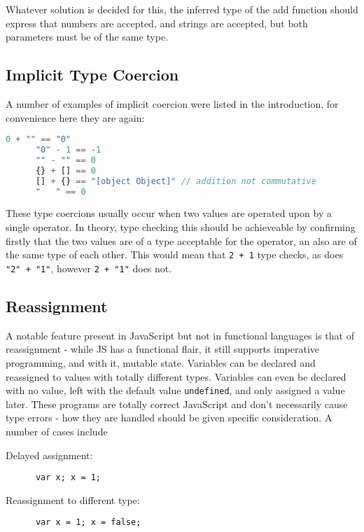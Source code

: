 \documentclass[british, twoside]{bhamthesis}
\theoremstyle{definition}
\begin{document}
    Whatever solution is decided for this, the inferred type of the add function should express that numbers are accepted, and strings are accepted, but both parameters must be of the same type.

  \subsection{Implicit Type Coercion}
    A number of examples of implicit coercion were listed in the introduction, for convenience here they are again:

    \begin{lstlisting}[language=JavaScript]
      0 + "" == "0"
      "0" - 1 == -1
      "" - "" == 0
      {} + [] == 0
      [] + {} == "[object Object]" // addition not commutative
      "   " == 0
    \end{lstlisting}

    These type coercions usually occur when two values are operated upon by a single operator. In theory, type checking this should be achieveable by confirming firstly that the two values are of a type acceptable for the operator, an also are of the same type of each other. This would mean that \texttt{2 + 1} type checks, as does \texttt{"2" + "1"}, however \texttt{2 + "1"} does not.

  \subsection{Reassignment}

    A notable feature present in JavaScript but not in functional languages is that of reassignment - while JS has a functional flair, it still supports imperative programming, and with it, mutable state. Variables can be declared and reassigned to values with totally different types. Variables can even be declared with no value, left with the default value \texttt{undefined}, and only assigned a value later. These programs are totally correct JavaScript and don't necessarily cause type errors - how they are handled should be given specific consideration. A number of cases include

    Delayed assignment:
    \begin{lstlisting}
      var x; x = 1;
    \end{lstlisting}

    Reassignment to different type:
    \begin{lstlisting}
      var x = 1; x = false;
    \end{lstlisting}
\end{document}
